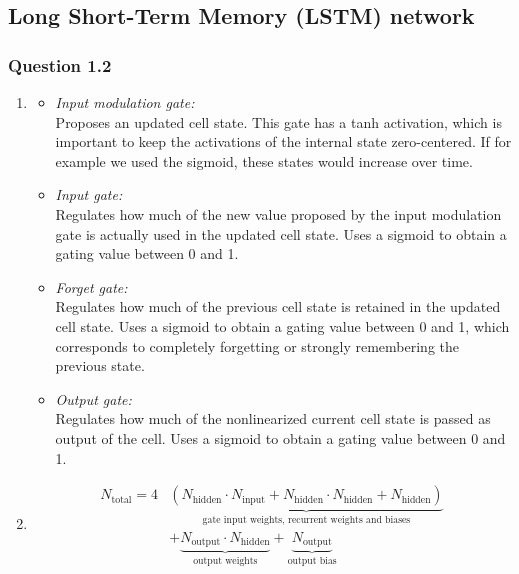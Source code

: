 \documentclass{article}
\begin{document}
\subsection{Long Short-Term Memory (LSTM) network}
\subsubsection*{Question 1.2}
\begin{enumerate}[label=(\alph*)]
	\item
	\begin{itemize}
		\item \textit{Input modulation gate:} \\Proposes an updated cell state. This gate has a tanh activation, which is important to keep the activations of the internal state zero-centered. If for example we used the sigmoid, these states would increase over time. \\
		\item \textit{Input gate:}\\ Regulates how much of the new value proposed by the input modulation gate is actually used in the updated cell state. Uses a sigmoid to obtain a gating value between 0 and 1.\\
		\item \textit{Forget gate:}\\ Regulates how much of the previous cell state is retained in the updated cell state. Uses a sigmoid to obtain a gating value between 0 and 1, which corresponds to completely forgetting or strongly remembering the previous state. \\
		\item \textit{Output gate:}\\ Regulates how much of the nonlinearized current cell state is passed as output of the cell. Uses a sigmoid to obtain a gating value between 0 and 1.\\
	\end{itemize}
	\item 
	$$
	\begin{aligned}
	N_{\text{total}} = 4&\underbrace{\left(N_{\text{hidden}}\cdot N_{\text{input}} + N_{\text{hidden}}\cdot N_{\text{hidden}} + N_{\text{hidden}}\right)}_{\text{gate input weights, recurrent weights and biases}} \\ &+ \underbrace{N_{\text{output}}\cdot N_{\text{hidden}}}_{\text{output weights}} + \underbrace{N_{\text{output}}}_{\text{output bias}}
	\end{aligned}
	$$
\end{enumerate}
\end{document}
